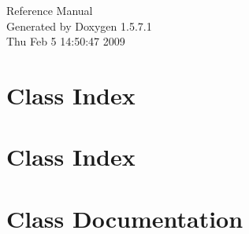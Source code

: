 \documentclass[a4paper]{book}
\begin{document}
\begin{titlepage}
\vspace*{7cm}
\begin{center}
{\Large Reference Manual}\\
\vspace*{1cm}
{\large Generated by Doxygen 1.5.7.1}\\
\vspace*{0.5cm}
{\small Thu Feb 5 14:50:47 2009}\\
\end{center}
\end{titlepage}
\clearemptydoublepage
{}
\tableofcontents
\clearemptydoublepage
{}
\chapter{Class Index}

\chapter{Class Index}

\chapter{Class Documentation}

















\printindex
\end{document}
